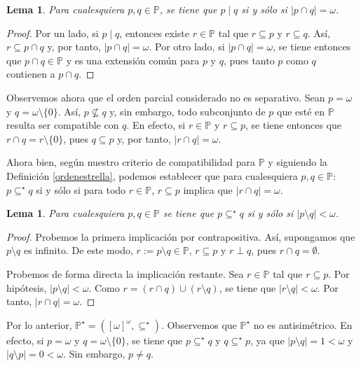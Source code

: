\documentclass[11pt]{unam_tesis1}
\theoremstyle{MyThmStyle}
\theoremstyle{definition}
\theoremstyle{plain}
\newtheorem{lemma}[definition]{Lema}
\theoremstyle{remark}
\begin{document}
\begin{lemma}\label{compatibilidadomega}
Para cualesquiera $p,q\in \mathbb P$, se tiene que $p\mid q$ si y s\'olo si $|p\cap q|=\omega$.
\end{lemma}

\begin{proof}
Por un lado, si $p\mid q$, entonces existe $r\in \mathbb P$ tal que $r\subseteq p$ y $r\subseteq q$. As\'i, $r\subseteq p\cap q$ y, por tanto, $|p\cap q|=\omega$. Por otro lado, si $|p\cap q|=\omega$, se tiene entonces que $p\cap q\in \mathbb P$ y es una extensi\'on com\'un para $p$ y $q$, pues tanto $p$ como $q$ contienen a $p\cap q$.
\end{proof}

Observemos ahora que el orden parcial considerado no es separativo. Sean $p=\omega$ y $q=\omega\setminus \{0\}$. As\'i, $p\nsubseteq q$ y, sin embargo, todo subconjunto de $p$ que est\'e en $\mathbb P$ resulta ser compatible con $q$. En efecto, si $r\in \mathbb P$ y $r\subseteq p$, se tiene entonces que $r\cap q=r\setminus \{0\}$, pues $q\subseteq p$ y, por tanto, $|r\cap q|=\omega$.

Ahora bien, seg\'un nuestro criterio de compatibilidad para $\mathbb P$ y siguiendo la Definici\'on \ref{ordenestrella}, podemos establecer que para cualesquiera $p,q\in \mathbb P$: $p\subseteq^{\star} q$ si y s\'olo si para todo $r \in \mathbb P$, $r\subseteq p$ implica que $|r\cap q|=\omega$.

\begin{lemma}
Para cualesquiera $p,q\in \mathbb P$ se tiene que $p\subseteq^{\star} q$ si y s\'olo si $|p\setminus q|<\omega$.
\end{lemma}

\begin{proof}
Probemos la primera implicaci\'on por contrapositiva. As\'i, supongamos que $p \setminus q$ es infinito. De este modo, $r := p \setminus q \in \mathbb P$, $r \subseteq p$ y $r \perp q$, pues $r \cap q = \emptyset$.

Probemos de forma directa la implicaci\'on restante. Sea $r\in \mathbb P$ tal que $r\subseteq p$. Por hip\'otesis, $|p\setminus q|<\omega$. Como $r = (r \cap q)\cup (r\setminus q)$, se tiene que $|r\setminus q|<\omega$. Por tanto, $|r\cap q|=\omega$.
\end{proof}

Por lo anterior, $\mathbb P^\star=([\omega]^\omega,\subseteq^\star)$. Observemos que $\mathbb P^\star$ no es antisim\'etrico. En efecto, si $p=\omega$ y $q=\omega\setminus \{0\}$, se tiene que $p\subseteq^\star q$ y $q\subseteq^\star p$, ya que $|p\setminus q|=1<\omega$ y $|q\setminus p|=0<\omega$. Sin embargo, $p\neq q$.
\end{document}
